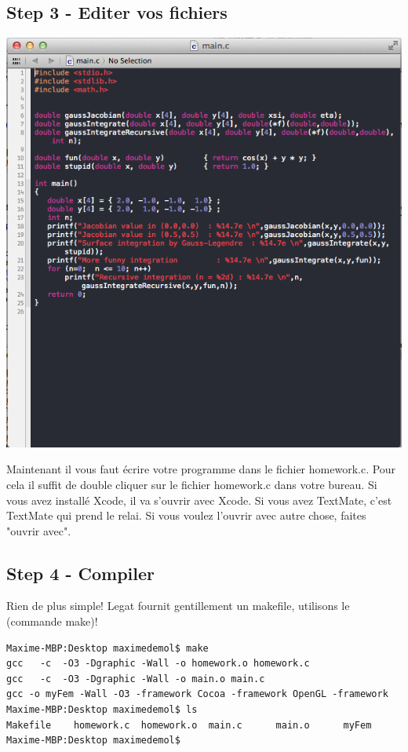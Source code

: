 \documentclass[11pt,a4paper]{article}
\begin{document}
\subsection{Step 3 - Editer vos fichiers}

\begin{minipage}[c]{.40\linewidth}
\includegraphics[width=\linewidth]{edit.png}
\end{minipage} \hfill
\begin{minipage}[c]{.50\linewidth}
Maintenant il vous faut écrire votre programme dans le fichier homework.c. Pour cela il suffit de double cliquer sur le fichier homework.c dans votre bureau. Si vous avez installé Xcode, il va s'ouvrir avec Xcode. Si vous avez TextMate, c'est TextMate qui prend le relai. Si vous voulez l'ouvrir avec autre chose, faites "ouvrir avec".
\end{minipage}

\subsection{Step 4 - Compiler}

Rien de plus simple! Legat fournit gentillement un makefile, utilisons le (commande make)!

\begin{lstlisting}[style=Bash]
Maxime-MBP:Desktop maximedemol$ make
gcc   -c  -O3 -Dgraphic -Wall -o homework.o homework.c
gcc   -c  -O3 -Dgraphic -Wall -o main.o main.c
gcc -o myFem -Wall -O3 -framework Cocoa -framework OpenGL -framework
Maxime-MBP:Desktop maximedemol$ ls
Makefile	homework.c	homework.o	main.c		main.o		myFem
Maxime-MBP:Desktop maximedemol$ 
\end{lstlisting}
\vspace{12pt}
\end{document}

